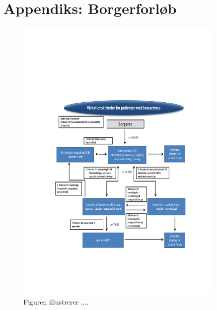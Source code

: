 \chapter{Appendiks: Borgerforløb}\vspace{-.75cm} \label{Borgerforloeb} 
\begin{figure}[H] 
	\begin{center}
		\includegraphics[width=0.9\textwidth]{rapportAfsnit/qBilag/Borgerforloeb}
	\end{center}
	\caption{Figuren illustrerer ....} 
	\label{} 
\end{figure}